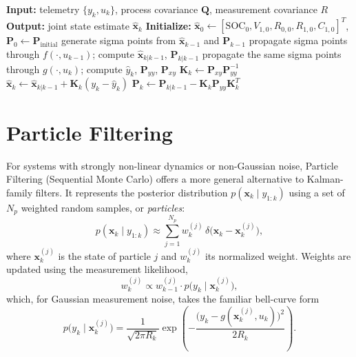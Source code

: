 \begin{algorithm}[htbp]
\caption{Joint Unscented Kalman Filter}
\label{alg:joint_ukf}
\small
\begin{algorithmic}[1]
\State \textbf{Input:} telemetry $\{y_k, u_k\}$, process covariance $\mathbf{Q}$, measurement covariance $R$
\State \textbf{Output:} joint state estimate $\hat{\mathbf{x}}_k$
\State \textbf{Initialize:} $\hat{\mathbf{x}}_0 \gets [\text{SOC}_0, V_{1,0}, R_{0,0}, R_{1,0}, C_{1,0}]^T$, \quad $\mathbf{P}_0 \gets \mathbf{P}_{\text{initial}}$
    \State generate sigma points from $\hat{\mathbf{x}}_{k-1}$ and $\mathbf{P}_{k-1}$
    \State propagate sigma points through $f(\cdot, u_{k-1})$; compute $\hat{\mathbf{x}}_{k|k-1}$, $\mathbf{P}_{k|k-1}$
    \State propagate the same sigma points through $g(\cdot, u_k)$; compute $\hat{y}_k$, $\mathbf{P}_{yy}$, $\mathbf{P}_{xy}$
    \State $\mathbf{K}_k \gets \mathbf{P}_{xy} \mathbf{P}_{yy}^{-1}$
    \State $\hat{\mathbf{x}}_k \gets \hat{\mathbf{x}}_{k|k-1} + \mathbf{K}_k (y_k - \hat{y}_k)$
    \State $\mathbf{P}_k \gets \mathbf{P}_{k|k-1} - \mathbf{K}_k \mathbf{P}_{yy} \mathbf{K}_k^T$
\EndFor
\end{algorithmic}
\end{algorithm}

\section{Particle Filtering}
\label{sec:particle_filtering}

For systems with strongly non-linear dynamics or non-Gaussian noise, Particle Filtering (Sequential Monte Carlo) offers a more general alternative to Kalman-family filters. It represents the posterior distribution $p(\mathbf{x}_k \mid y_{1:k})$ using a set of $N_p$ weighted random samples, or \emph{particles}:
\begin{equation}
p(\mathbf{x}_k \mid y_{1:k}) \approx \sum_{j=1}^{N_p} w_k^{(j)}\, \delta\big(\mathbf{x}_k - \mathbf{x}_k^{(j)}\big),
\end{equation}
where $\mathbf{x}_k^{(j)}$ is the state of particle $j$ and $w_k^{(j)}$ its normalized weight. Weights are updated using the measurement likelihood,
\begin{equation}
w_k^{(j)} \propto w_{k-1}^{(j)} \cdot p\big(y_k \mid \mathbf{x}_k^{(j)}\big),
\end{equation}
which, for Gaussian measurement noise, takes the familiar bell-curve form
\begin{equation}
p\big(y_k \mid \mathbf{x}_k^{(j)}\big) = \frac{1}{\sqrt{2\pi R_k}} \exp\!\left( -\frac{\big(y_k - g(\mathbf{x}_k^{(j)}, u_k)\big)^2}{2 R_k} \right).
\end{equation}

